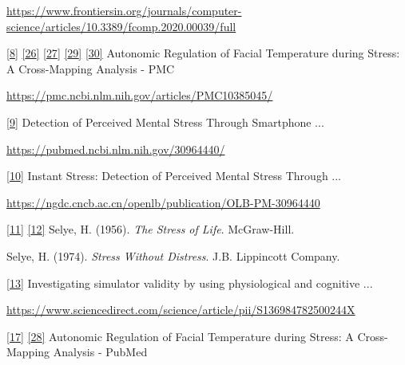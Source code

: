 \documentclass[12pt,a4paper]{article}
\begin{document}
\url{https://www.frontiersin.org/journals/computer-science/articles/10.3389/fcomp.2020.00039/full}

\href{https://pmc.ncbi.nlm.nih.gov/articles/PMC10385045/\#:~:text=Numerous\%20studies\%20have\%20investigated\%20the,natural\%20physiological\%20responses\%20under\%20study}{{[}8{]}} \href{https://pmc.ncbi.nlm.nih.gov/articles/PMC10385045/\#:~:text=Skin\%20temperature\%20reflects\%20the\%20Autonomic,CM}{{[}26{]}} \href{https://pmc.ncbi.nlm.nih.gov/articles/PMC10385045/\#:~:text=responsible\%20for\%20the\%20thermal\%20modulation,6\%20\%2C\%2030\%2C10}{{[}27{]}} \href{https://pmc.ncbi.nlm.nih.gov/articles/PMC10385045/\#:~:text=both\%20conditions\%2C\%20which\%20was\%20not,signals\%20significantly\%20varies\%20with\%20gender}{{[}29{]}} \href{https://pmc.ncbi.nlm.nih.gov/articles/PMC10385045/\#:~:text=Among\%20the\%20facial\%20regions\%2C\%20the,as\%20shown\%20in\%20Figure\%204}{{[}30{]}} Autonomic Regulation of Facial Temperature during Stress: A Cross-Mapping Analysis - PMC

\url{https://pmc.ncbi.nlm.nih.gov/articles/PMC10385045/}

\href{https://pubmed.ncbi.nlm.nih.gov/30964440/\#:~:text=,cheap\%2C\%20convenient\%2C\%20and\%20mobile}{{[}9{]}} Detection of Perceived Mental Stress Through Smartphone ...

\url{https://pubmed.ncbi.nlm.nih.gov/30964440/}

\href{https://ngdc.cncb.ac.cn/openlb/publication/OLB-PM-30964440\#:~:text=camera\%20can\%20be\%20used\%20to,convenient\%2C\%20and\%20mobile\%20monitoring\%20systems}{{[}10{]}} Instant Stress: Detection of Perceived Mental Stress Through ...

\url{https://ngdc.cncb.ac.cn/openlb/publication/OLB-PM-30964440}

\href{Selye1956}{{[}11{]}} \href{Selye1974}{{[}12{]}} Selye, H. (1956). \emph{The Stress of Life}. McGraw-Hill.

Selye, H. (1974). \emph{Stress Without Distress}. J.B. Lippincott Company.

\href{https://www.sciencedirect.com/science/article/pii/S136984782500244X\#:~:text=,1994\%29\%2C\%20whereas}{{[}13{]}} Investigating simulator validity by using physiological and cognitive ...

\url{https://www.sciencedirect.com/science/article/pii/S136984782500244X}

\href{https://pubmed.ncbi.nlm.nih.gov/37514696/\#:~:text=regions\%20with\%20the\%20ANS\%20correlates,signals\%20significantly\%20varies\%20with\%20gender}{{[}17{]}} \href{https://pubmed.ncbi.nlm.nih.gov/37514696/\#:~:text=both\%20conditions\%2C\%20which\%20was\%20not,signals\%20significantly\%20varies\%20with\%20gender}{{[}28{]}} Autonomic Regulation of Facial Temperature during Stress: A Cross-Mapping Analysis - PubMed
\end{document}
